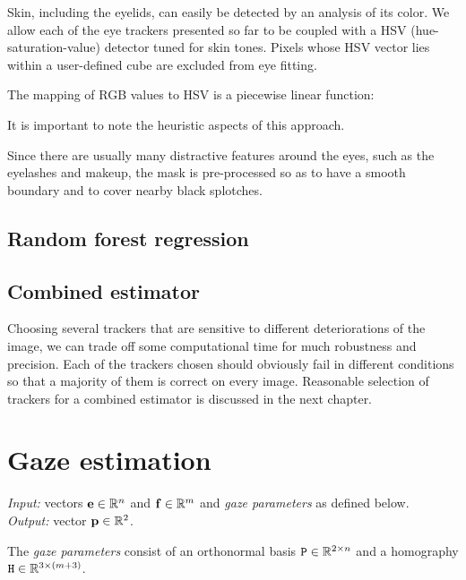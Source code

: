 Skin, including the eyelids, can easily be detected by an analysis of its color.
We allow each of the eye trackers presented so far to be coupled with a HSV (hue-saturation-value) detector tuned for skin tones.
Pixels whose HSV vector lies within a user-defined cube are excluded from eye fitting.

The mapping of RGB values to HSV is a piecewise linear function:

It is important to note the heuristic aspects of this approach.

Since there are usually many distractive features around the eyes, such as the eyelashes and makeup, the mask is pre-processed so as to have a smooth boundary and to cover nearby black splotches.


\subsection{Random forest regression}

\subsection{Combined estimator}

Choosing several trackers that are sensitive to different deteriorations of the image, we can trade off some computational time for much robustness and precision.
Each of the trackers chosen should obviously fail in different conditions so that a majority of them is correct on every image.
Reasonable selection of trackers for a combined estimator is discussed in the next chapter.

\section{Gaze estimation}

\textit{Input:} vectors $\mathbf{e} \in \mathbb{R}^n$ and $\mathbf{f} \in \mathbb{R}^m$ and \textit{gaze parameters} as defined below.\\
\textit{Output:} vector $\mathbf{p} \in \mathbb{R}^2$.\\

\begin{definition} \label{d:gaze-parameters}
The \textit{gaze parameters} consist of an orthonormal basis $\mathtt{P} \in \mathbb{R}^{2\times n}$ and a homography $\mathtt{H} \in \mathbb{R}^{3 \times (m+3)}$.
\end{definition}

